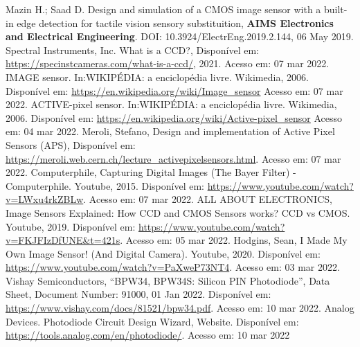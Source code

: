 \documentclass[10pt,a4paper,twocolumn]{article}
\begin{document}
	\begin{thebibliography}{99}
		{Mazin H.; Saad D. {Design and simulation of a CMOS image sensor with a built-in edge detection for tactile vision sensory substituition}, \textbf{AIMS Electronics and Electrical Engineering}. DOI: 10.3924/ElectrEng.2019.2.144, 06 May 2019.}
		{Spectral Instruments, Inc. {What is a CCD?}, Disponível em: \url{https://specinstcameras.com/what-is-a-ccd/}, 2021. Acesso em: 07 mar 2022.}
		{IMAGE sensor. In:WIKIPÉDIA: a enciclopédia livre. Wikimedia, 2006. Disponível em: \url{https://en.wikipedia.org/wiki/Image_sensor} Acesso em: 07 mar 2022.}
		{ACTIVE-pixel sensor. In:WIKIPÉDIA: a enciclopédia livre. Wikimedia, 2006. Disponível em: \url{https://en.wikipedia.org/wiki/Active-pixel_sensor} Acesso em: 04 mar 2022.}
		{Meroli, Stefano, {Design and implementation of Active Pixel Sensors (APS)}, Disponível em: \url{https://meroli.web.cern.ch/lecture_activepixelsensors.html}. Acesso em: 07 mar 2022.}
		{Computerphile, {Capturing Digital Images (The Bayer Filter) - Computerphile}. Youtube, 2015. Disponível em: \url{https://www.youtube.com/watch?v=LWxu4rkZBLw}. Acesso em: 07 mar 2022.}
		{ALL ABOUT ELECTRONICS, {Image Sensors Explained: How CCD and CMOS Sensors works? CCD vs CMOS}. Youtube, 2019. Disponível em: \url{https://www.youtube.com/watch?v=FKJFIzDfUNE&t=421s}. Acesso em: 05 mar 2022.}
		{Hodgins, Sean, {I Made My Own Image Sensor! (And Digital Camera)}. Youtube, 2020. Disponível em: \url{https://www.youtube.com/watch?v=PaXweP73NT4}. Acesso em: 03 mar 2022.}
		{Vishay Semiconductors, {``BPW34, BPW34S: Silicon PIN Photodiode''}, Data Sheet, Document Number: 91000, 01 Jan 2022. Disponível em: \url{https://www.vishay.com/docs/81521/bpw34.pdf}. Acesso em: 10 mar 2022.}
		{Analog Devices. {Photodiode Circuit Design Wizard}, Website. Disponível em: \url{https://tools.analog.com/en/photodiode/}. Acesso em: 10 mar 2022}

	\end{thebibliography}
\end{document}
